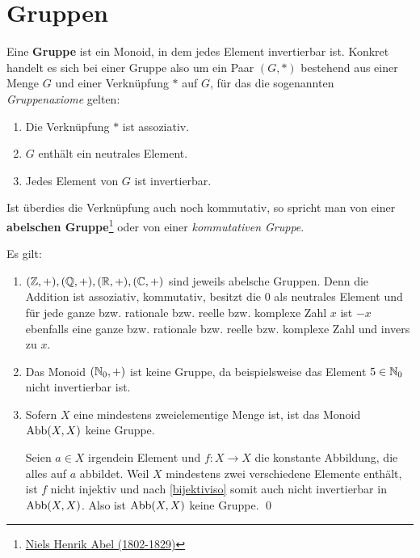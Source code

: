 \section{Gruppen}


\begin{de}[Gruppe]  
    Eine \textbf{Gruppe} ist ein Monoid, in dem jedes Element invertierbar ist. Konkret handelt es sich bei einer Gruppe also um ein Paar $(G,*)$ bestehend aus einer Menge $G$ und einer Verknüpfung $*$ auf $G$, für das die sogenannten \emph{Gruppenaxiome} gelten:
    \begin{enumerate}[(G1), labelindent=1.5em, leftmargin=*]
        \item Die Verknüpfung $*$ ist assoziativ.
        \item $G$ enthält ein neutrales Element.
        \item Jedes Element von $G$ ist invertierbar.
    \end{enumerate}
    Ist überdies die Verknüpfung auch noch kommutativ, so spricht man von einer \textbf{abelschen Gruppe}\footnote{\href{https://de.wikipedia.org/wiki/Niels_Henrik_Abel}{Niels Henrik Abel (1802-1829)}} oder von einer \emph{kommutativen Gruppe}.
\end{de}


\begin{bsp}
    Es gilt:
    \begin{enumerate}
        \item $(\mathbb Z,+),(\mathbb Q,+),(\mathbb R,+),(\mathbb C,+)$ sind jeweils abelsche Gruppen. Denn die Addition ist assoziativ, kommutativ, besitzt die $0$ als neutrales Element und für jede ganze bzw. rationale bzw. reelle bzw. komplexe Zahl $x$ ist $-x$ ebenfalls eine ganze bzw. rationale bzw. reelle bzw. komplexe Zahl und invers zu $x$.
        \item Das Monoid $(\mathbb N_0,+)$ ist keine Gruppe, da beispielsweise das Element $5\in \mathbb N_0$ nicht invertierbar ist.
        \item Sofern $X$ eine mindestens zweielementige Menge ist, ist das Monoid $\operatorname{Abb}(X,X)$ keine Gruppe.
        \begin{bew}[(*)]
            Seien $a\in X$ irgendein Element und $f:X\to X$ die konstante Abbildung, die alles auf $a$ abbildet. Weil $X$ mindestens zwei verschiedene Elemente enthält, ist $f$ nicht injektiv und nach \cref{bijektiviso} somit auch nicht invertierbar in $\operatorname{Abb}(X,X)$. Also ist $\operatorname{Abb}(X,X)$ keine Gruppe. \qed
        \end{bew}
    \end{enumerate}
\end{bsp}


